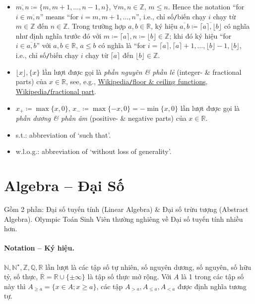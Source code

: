 \documentclass{article}
\begin{document}
\begin{itemize}
	\item $\overline{m,n}\coloneqq\{m,m + 1,\ldots,n - 1, n\}$, $\forall m,n\in\mathbb{Z}$, $m\le n$. Hence the notation ``for $i\in\overline{m,n}$'' means ``for $i = m,m + 1,\ldots,n$'', i.e., chỉ số{\tt/}biến chạy $i$ chạy từ $m\in\mathbb{Z}$ đến $n\in\mathbb{Z}$. Trong trường hợp $a,b\in\mathbb{R}$, ký hiệu $\overline{a,b}\coloneqq\overline{\lceil a\rceil,\lfloor b\rfloor}$ có nghĩa như định nghĩa trước đó với $m\coloneqq\lceil a\rceil,n\coloneqq\lfloor b\rfloor\in\mathbb{Z}$; khi đó ký hiệu ``for $i\in\overline{a,b}$'' với $a,b\in\mathbb{R}$, $a\le b$ có nghĩa là ``for $i = \lceil a\rceil,\lceil a\rceil + 1,\ldots,\lfloor b\rfloor - 1,\lfloor b\rfloor$, i.e., chỉ số{\tt/}biến chạy $i$ chạy từ $\lceil a\rceil$ đến $\lfloor b\rfloor\in\mathbb{Z}$.
	\item $\lfloor x\rfloor,\{x\}$ lần lượt được gọi là {\it phần nguyên \& phần lẻ} (integer- \& fractional parts) của $x\in\mathbb{R}$, see, e.g., \href{https://en.wikipedia.org/wiki/Floor_and_ceiling_functions}{Wikipedia{\tt/}floor \& ceiling functions}, \href{https://en.wikipedia.org/wiki/Fractional_part}{Wikipedia{\tt/}fractional part}.
	\item $x_+\coloneqq\max\{x,0\}$, $x_-\coloneqq\max\{-x,0\} = -\min\{x,0\}$ lần lượt được gọi là {\it phần dương \& phần âm} (positive- \& negative parts) của $x\in\mathbb{R}$.
	\item s.t.: abbreviation of `such that'.
	\item w.l.o.g.: abbreviation of `without loss of generality'.
\end{itemize}


\section{Algebra -- Đại Số}
Gồm 2 phần: Đại số tuyến tính (Linear Algebra) \& Đại số trừu tượng (Abstract Algebra). Olympic Toán Sinh Viên thường nghiêng về Đại số tuyến tính nhiều hơn.

\paragraph{Notation -- Ký hiệu.} $\mathbb{N},\mathbb{N}^\star,\mathbb{Z},\mathbb{Q},\mathbb{R}$ lần lượt là các tập số tự nhiên, số nguyên dương, số nguyên, số hữu tỷ, số thực, $\overline{\mathbb{R}} = \mathbb{R}\cup\{\pm\infty\}$ là tập số thực mở rộng. Với $A$ là 1 trong các tập số này thì $A_{\ge a} = \{x\in A;x\ge a\}$, các tập $A_{> a},A_{\le a},A_{< a}$ được định nghĩa tương tự.
\end{document}
